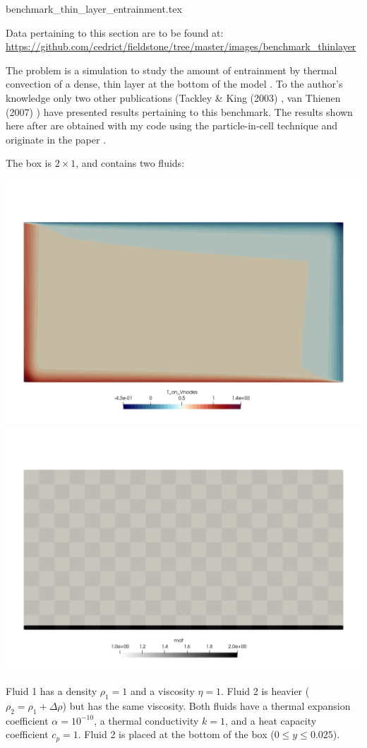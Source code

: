 \begin{flushright} {\tiny {\color{gray} benchmark\_thin\_layer\_entrainment.tex}} \end{flushright}

\vspace{0.5cm}
\begin{flushright}
Data pertaining to this section are to be found at:
\url{https://github.com/cedrict/fieldstone/tree/master/images/benchmark_thinlayer}
\end{flushright}
\vspace{0.5cm}

The problem is a simulation to study the
amount of entrainment by thermal convection of a dense,
thin layer at the bottom of the model \cite{vaks97}. 
To the author's knowledge only two other publications (Tackley \& King (2003) \cite{taki03},
van Thienen (2007) \cite{vant07})
have presented results pertaining to this benchmark.
The results shown here after are obtained with my \elefant code using 
the particle-in-cell technique and originate in the \elefant paper \cite{thie14}. 

The box is $2\times 1$, and contains two fluids:
\begin{center}
\includegraphics[width=0.45\linewidth]{images/benchmark_thinlayer/temperature_init}
\includegraphics[width=0.45\linewidth]{images/benchmark_thinlayer/mat_init}
\end{center}
Fluid 1 has a density $\rho_1=1$ and a viscosity $\eta=1$.
Fluid 2 is heavier ($\rho_2=\rho_1 + \Delta \rho$) 
but has the same viscosity. 
Both fluids have a thermal expansion coefficient $\alpha=10^{-10}$, a 
thermal conductivity $k=1$, and a heat capacity coefficient $c_p=1$.
Fluid 2 is placed at the bottom of the box ($0\leq y \leq 0.025$).

